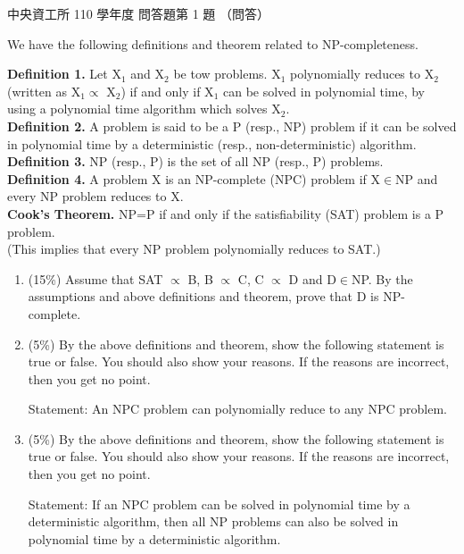 \begin{pastexam}[label={px:ncu-110-dsa-11}]{中央資工所 110 學年度 問答題第 1 題}
（問答）

We have the following definitions and theorem related to NP-completeness.

\textbf{Definition 1.} Let X$_1$ and X$_2$ be tow problems. X$_1$ polynomially reduces to X$_2$
(written as X$_1\propto$ X$_2$) if and only if X$_1$ can be solved in polynomial time, by using a
polynomial time algorithm which solves X$_2$.\\
\textbf{Definition 2.} A problem is said to be a P (resp., NP) problem if it can be solved in
polynomial time by a deterministic (resp., non-deterministic) algorithm.\\
\textbf{Definition 3.} NP (resp., P) is the set of all NP (resp., P) problems.\\
\textbf{Definition 4.} A problem X is an NP-complete (NPC) problem if X$\in$NP and every NP problem
reduces to X.\\
\textbf{Cook's Theorem.} NP=P if and only if the satisfiability (SAT) problem is a P problem.\\
(This implies that every NP problem polynomially reduces to SAT.)
\begin{enumerate}[label=(\Alph*)]
\item (15\%) Assume that SAT $\propto$ B, B $\propto$ C, C $\propto$ D and D$\in$NP. By the
assumptions and above definitions and theorem, prove that D is NP-complete.
\item (5\%) By the above definitions and theorem, show the following statement is true or false.
You should also show your reasons. If the reasons are incorrect, then you get no point.

Statement: An NPC problem can polynomially reduce to any NPC problem.
\item (5\%) By the above definitions and theorem, show the following statement is true or false.
You should also show your reasons. If the reasons are incorrect, then you get no point.

Statement: If an NPC problem can be solved in polynomial time by a deterministic algorithm, then
all NP problems can also be solved in polynomial time by a deterministic algorithm.
\end{enumerate}
\end{pastexam}

